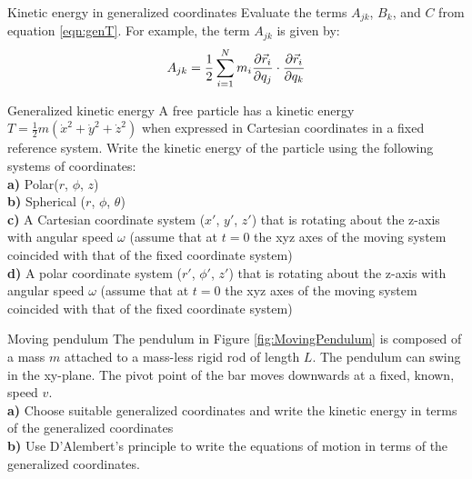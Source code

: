 \begin{problem}{Kinetic energy in generalized coordinates} Evaluate the terms $A_{jk}$, $B_{k}$, and $C$ from equation \ref{eqn:genT}. For example, the term $A_{jk}$ is given by:
\begin{align*}
A_{jk}=\frac{1}{2}\sum_{i=1}^Nm_i\frac{\partial \vec r_i}{\partial q_j}\cdot\frac{\partial \vec r_i}{\partial q_k}
\end{align*}
\label{prob_VirtWork_3}
\end{problem}

\begin{problem} {Generalized kinetic energy} A free particle has a kinetic energy $T=\frac{1}{2}m(\dot x^2+\dot y^2+\dot z^2)$ when expressed in Cartesian coordinates in a fixed reference system. Write the kinetic energy of the particle using the following systems of coordinates:\\
\textbf{a)} Polar($r$, $\phi$, $z$)\\
\textbf{b)} Spherical ($r$, $\phi$, $\theta$)\\
\textbf{c)} A Cartesian coordinate system ($x'$, $y'$, $z'$) that is rotating about the z-axis with angular speed $\omega$ (assume that at $t=0$ the xyz axes of the moving system coincided with that of the fixed coordinate system)\\
\textbf{d)} A polar coordinate system ($r'$, $\phi'$, $z'$) that is rotating about the z-axis with angular speed $\omega$ (assume that at $t=0$ the xyz axes of the moving system coincided with that of the fixed coordinate system)
\label{prob_VirtWork_4}
\end{problem}


\begin{problem}{Moving pendulum}
The pendulum in Figure \ref{fig:MovingPendulum} is composed of a mass $m$ attached to a mass-less rigid rod of length $L$. The pendulum can swing in the xy-plane. The pivot point of the bar moves downwards at a fixed, known, speed $v$.
\\
\textbf{a)} Choose suitable generalized coordinates and write the kinetic energy in terms of the generalized coordinates\\
\textbf{b)} Use D'Alembert's principle to write the equations of motion in terms of the generalized coordinates.
\label{prob_VirtWork_5}
\end{problem}

